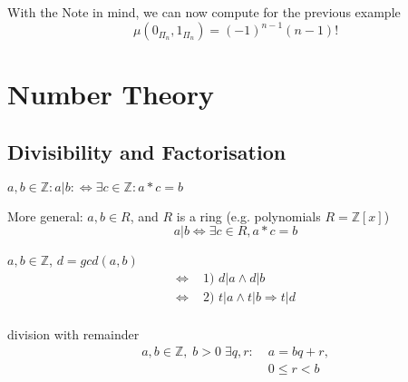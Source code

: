With the Note in mind, we can now compute for the previous example
\[
    \mu( 0_{\Pi_n}, 1_{\Pi_n}) = (-1)^{n-1} (n-1)!
\]


\chapter{Number Theory}

\section{Divisibility and Factorisation}

\begin{definition}
$a,b \in \mathbb{Z}: a|b: \Leftrightarrow \exists c \in \mathbb{Z}: a * c = b$

More general: 
$a,b \in R$, and $R$ is a ring (e.g. polynomials $R = \mathbb{Z}[x]$)
\[
  a|b \Leftrightarrow \exists c \in R , a * c = b
\]
\end{definition}

\begin{definition}
$a,b \in \mathbb{Z}$, $d = gcd(a,b)$
\begin{align*}
    \Leftrightarrow & \text{ 1) } d|a \wedge d|b \\
    \Leftrightarrow & \text{ 2) } t|a \wedge t|b \Rightarrow t|d \\
\end{align*}
\end{definition}

\begin{definition}
division with remainder
\begin{align*}
  a,b \in \mathbb{Z}, \; 
  b > 0 \;\exists q,r: 
    & \; a = b q  + r, \\ 
    & \; 0 \leq r < b
\end{align*}
\end{definition}



